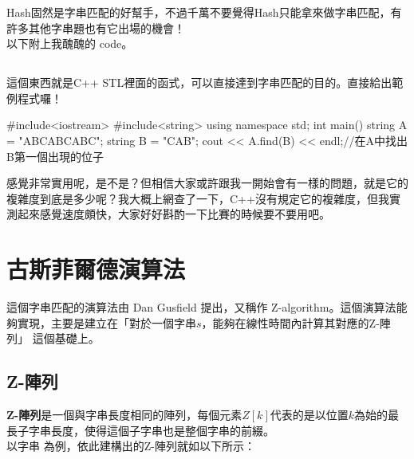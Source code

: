 \documentclass[main.tex]{subfiles}
\begin{document}
Hash固然是字串匹配的好幫手，不過千萬不要覺得Hash只能拿來做字串匹配，有許多其他字串題也有它出場的機會！\\

以下附上我醜醜的 code。

\subsection{}
這個東西就是C++ STL裡面的函式，可以直接達到字串匹配的目的。直接給出範例程式囉！
\begin{C++}
#include<iostream>
#include<string>
using namespace std;
int main()
{
  string A = "ABCABCABC";
  string B = "CAB";
  cout << A.find(B) << endl;//在A中找出B第一個出現的位子
}
\end{C++}
感覺非常實用呢，是不是？但相信大家或許跟我一開始會有一樣的問題，就是它的複雜度到底是多少呢？我大概上網查了一下，C++沒有規定它的複雜度，但我實測起來感覺速度頗快，大家好好斟酌一下比賽的時候要不要用吧。

\section{古斯菲爾德演算法}

這個字串匹配的演算法由 Dan Gusfield 提出，又稱作 Z-algorithm。這個演算法能夠實現，主要是建立在「對於一個字串$s$，能夠在線性時間內計算其對應的Z-陣列」 這個基礎上。\\

\subsection{Z-陣列}

\textbf{Z-陣列}是一個與字串長度相同的陣列，每個元素$Z[k]$代表的是以位置$k$為始的最長子字串長度，使得這個子字串也是整個字串的前綴。\\

以字串 為例，依此建構出的Z-陣列就如以下所示：\\
\end{document}
